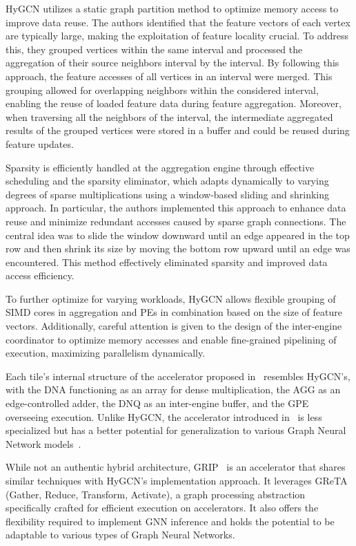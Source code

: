 HyGCN utilizes a static graph partition method to optimize memory access to improve data reuse.
The authors identified that the feature vectors of each vertex are typically large, making the exploitation of feature locality crucial.
To address this, they grouped vertices within the same interval and processed the aggregation of their source neighbors interval by the interval.
By following this approach, the feature accesses of all vertices in an interval were merged.
This grouping allowed for overlapping neighbors within the considered interval, enabling the reuse of loaded feature data during feature aggregation.
Moreover, when traversing all the neighbors of the interval, the intermediate aggregated results of the grouped vertices were stored in a buffer and could be reused during feature updates.

Sparsity is efficiently handled at the aggregation engine through effective scheduling and the sparsity eliminator, which adapts dynamically to varying degrees of sparse multiplications using a window-based sliding and shrinking approach.
In particular, the authors implemented this approach to enhance data reuse and minimize redundant accesses caused by sparse graph connections.
The central idea was to slide the window downward until an edge appeared in the top row and then shrink its size by moving the bottom row upward until an edge was encountered.
This method effectively eliminated sparsity and improved data access efficiency.

To further optimize for varying workloads, HyGCN allows flexible grouping of SIMD cores in aggregation and PEs in combination based on the size of feature vectors.
Additionally, careful attention is given to the design of the inter-engine coordinator to optimize memory accesses and enable fine-grained pipelining of execution, maximizing parallelism dynamically.

Each tile's internal structure of the accelerator proposed in~\cite{9218751} resembles HyGCN's, with the DNA functioning as an array for dense multiplication, the AGG as an edge-controlled adder, the DNQ as an inter-engine buffer, and the GPE overseeing execution.
Unlike HyGCN, the accelerator introduced in~\cite{9218751} is less specialized but has a better potential for generalization to various Graph Neural Network models~\cite{DBLP:journals/corr/abs-2010-00130}.

While not an authentic hybrid architecture, GRIP~\cite{DBLP:journals/corr/abs-2007-13828} is an accelerator that shares similar techniques with HyGCN's implementation approach.
It leverages GReTA~\cite{greta-recoml20} (Gather, Reduce, Transform, Activate), a graph processing abstraction specifically crafted for efficient execution on accelerators.
It also offers the flexibility required to implement GNN inference and holds the potential to be adaptable to various types of Graph Neural Networks.

